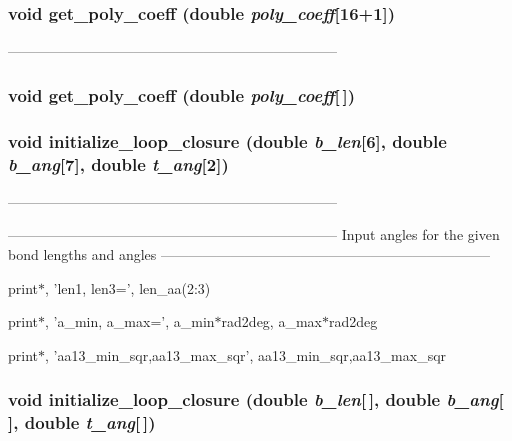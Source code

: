 \subsubsection{\setlength{\rightskip}{0pt plus 5cm}void get\_\-poly\_\-coeff (double {\em poly\_\-coeff}[16+1])}\label{PTripepClosure_8h_ffe1c9ec74382b7d5fa96076321d6ef9}


----------------------------------------------------------------------- 

\subsubsection{\setlength{\rightskip}{0pt plus 5cm}void get\_\-poly\_\-coeff (double {\em poly\_\-coeff}[$\,$])}\label{PTripepClosure_8h_203eb9dfcc71e1ac2eb39d965ebe2534}


\subsubsection{\setlength{\rightskip}{0pt plus 5cm}void initialize\_\-loop\_\-closure (double {\em b\_\-len}[6], double {\em b\_\-ang}[7], double {\em t\_\-ang}[2])}\label{PTripepClosure_8h_973c4d1d0e2d03aafaa64f180fd67723}


----------------------------------------------------------------------- 



----------------------------------------------------------------------- Input angles for the given bond lengths and angles -----------------------------------------------------------------------

print$\ast$, 'len1, len3=', len\_\-aa(2:3)

print$\ast$, 'a\_\-min, a\_\-max=', a\_\-min$\ast$rad2deg, a\_\-max$\ast$rad2deg

print$\ast$, 'aa13\_\-min\_\-sqr,aa13\_\-max\_\-sqr', aa13\_\-min\_\-sqr,aa13\_\-max\_\-sqr 
\subsubsection{\setlength{\rightskip}{0pt plus 5cm}void initialize\_\-loop\_\-closure (double {\em b\_\-len}[$\,$], double {\em b\_\-ang}[$\,$], double {\em t\_\-ang}[$\,$])}\label{PTripepClosure_8h_c13029e9c309cab97f120a2be745a0d0}


